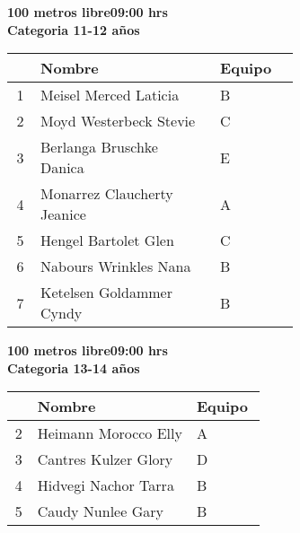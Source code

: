 \begin{minipage}{0.95\linewidth}\vspace{0.5cm} 
\begin{flushleft}
\textbf{
\hspace{-0.15cm}100 metros libre\hspace{1.5cm}09:00 hrs \\Categoria 11-12 años}\vspace{-0.2cm} 
\end{flushleft}
\begin{tabular}{cp{0.63\linewidth}l}
\hline
& \textbf{Nombre} & \textbf{Equipo} \\ \hline
1 & Meisel Merced Laticia & B \\ 
2 & Moyd Westerbeck Stevie & C \\ 
3 & Berlanga Bruschke Danica & E \\ 
4 & Monarrez Claucherty Jeanice & A \\ 
5 & Hengel Bartolet Glen & C \\ 
6 & Nabours Wrinkles Nana & B \\ 
7 & Ketelsen Goldammer Cyndy & B \\ 
\end{tabular}
\end{minipage}
\begin{minipage}{0.95\linewidth}\vspace{0.5cm} 
\begin{flushleft}
\textbf{
\hspace{-0.15cm}100 metros libre\hspace{1.5cm}09:00 hrs \\Categoria 13-14 años}\vspace{-0.2cm} 
\end{flushleft}
\begin{tabular}{cp{0.63\linewidth}l}
\hline
& \textbf{Nombre} & \textbf{Equipo} \\ \hline
2 & Heimann Morocco Elly & A \\ 
3 & Cantres Kulzer Glory & D \\ 
4 & Hidvegi Nachor Tarra & B \\ 
5 & Caudy Nunlee Gary & B \\ 
\end{tabular}
\end{minipage}
